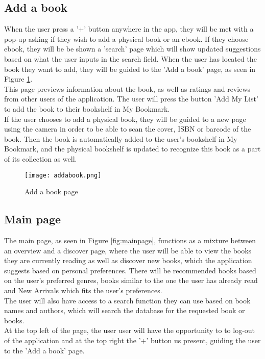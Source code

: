 \documentclass[conference]{IEEEtran}
\begin{document}
\subsection{Add a book}
When the user press a '+' button anywhere in the app, they will be met with a pop-up asking if they wish to add a physical book or an ebook. If they choose ebook, they will be be shown a 'search' page which will show updated suggestions based on what the user inputs in the search field. When the user has located the book they want to add, they will be guided to the 'Add a book' page, as seen in Figure \ref{fig:addabook}. \\
This page previews information about the book, as well as ratings and reviews from other users of the application. The user will press the button 'Add My List' to add the book to their bookshelf in My Bookmark.\\

If the user chooses to add a physical book, they will be guided to a new page using the camera in order to be able to scan the cover, ISBN or barcode of the book. Then the book is automatically added to the user's bookshelf in My Bookmark, and the physical bookshelf is updated to recognize this book as a part of its collection as well.

\begin{figure}[h]
    \centering
    \texttt{[image: addabook.png]}
    \caption{Add a book page}
    \label{fig:addabook}
\end{figure}

\subsection{Main page}
The main page, as seen in Figure \ref{fig:mainpage}, functions as a mixture between an overview and a discover page, where the user will be able to view the books they are currently reading as well as discover new books, which the application suggests based on personal preferences. There will be recommended books based on the user's preferred genres, books similar to the one the user has already read and New Arrivals which fits the user's preferences. \\

The user will also have access to a search function they can use based on book names and authors, which will search the database for the requested book or books.\\
At the top left of the page, the user user will have the opportunity to to log-out of the application and at the top right the '+' button us present, guiding the user to the 'Add a book' page.
\end{document}
